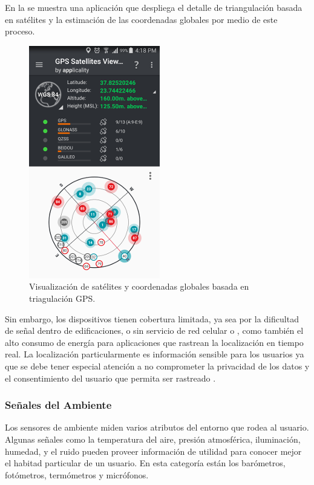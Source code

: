En la  se muestra una aplicación que despliega el
detalle de triangulación basada en satélites y la estimación de las
coordenadas globales por medio de este proceso.

\begin{figure}[!tbph]
\begin{centering}
\includegraphics[scale=0.8]{capitulo-4/graphics/gps}
\par\end{centering}
\caption[Coordenadas GPS.]{\label{fig4:gps}Visualización de satélites y coordenadas globales
basada en triagulación GPS.}
\end{figure}

Sin embargo, los dispositivos  tienen cobertura limitada,
ya sea por la dificultad de señal dentro de edificaciones, o sin servicio
de red celular o , como también el alto consumo de energía
para aplicaciones que rastrean la localización en tiempo real. La
localización particularmente es información sensible para los usuarios
ya que se debe tener especial atención a no comprometer la privacidad
de los datos y el consentimiento del usuario que permita ser rastreado
\cite{LaraLabrador2013}.

\subsubsection{Señales del Ambiente}

Los sensores de ambiente miden varios atributos del entorno que rodea
al usuario. Algunas señales como la temperatura del aire, presión
atmosférica, iluminación, humedad, y el ruido pueden proveer información
de utilidad para conocer mejor el habitad particular de un usuario.
En esta categoría están los barómetros, fotómetros, termómetros y
micrófonos.

